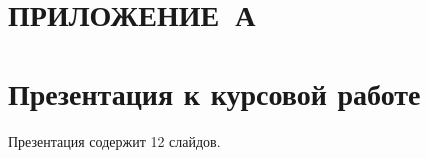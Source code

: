\section*{ПРИЛОЖЕНИЕ~А}	



\section*{Презентация к курсовой работе}
Презентация содержит 12 слайдов.